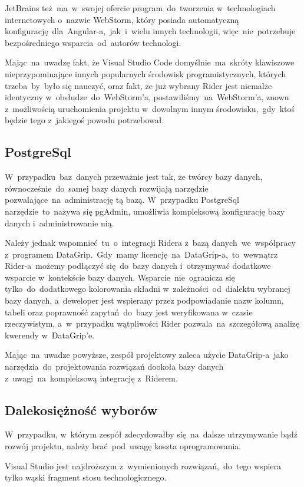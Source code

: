 JetBrains też~ma~w~swojej ofercie program~do~tworzenia w~technologiach internetowych o~nazwie WebStorm, który posiada automatyczną konfigurację~dla~Angular-a,~jak~i~wielu innych technologii, więc~nie~potrzebuje bezpośredniego wsparcia~od~autorów technologi.

Mając~na~uwadzę fakt, że Visual Studio Code domyślnie~ma~skróty klawiszowe nieprzypominające innych popularnych środowisk programistycznych, których trzeba~by~było się nauczyć, oraz fakt, że już wybrany Rider jest niemalże identyczny w~obsłudze~do~WebStorm'a, postawiliśmy~na~WebStorm'a, znowu z~możliwością uruchomienia projektu w~dowolnym innym środowisku,~gdy~ktoś będzie tego z~jakiegoś powodu potrzebował.

\subsection{PostgreSql}\label{subsec:postgresql}
W~przypadku~baz~danych przeważnie jest tak, że twórcy bazy danych, równocześnie~do~samej bazy danych rozwijają narzędzie pozwalające~na~administrację tą bazą.
W~przypadku PostgreSql narzędzie~to~nazywa się pgAdmin, umożliwia kompleksową konfigurację bazy danych i~administrowanie nią.

Należy jednak wspomnieć~tu~o~integracji Ridera z~bazą danych~we~współpracy z~programem DataGrip.~Gdy~mamy licencję~na~DataGrip-a,~to~wewnątrz Rider-a~możemy podłączyć się~do~bazy danych i~otrzymywać dodatkowe wsparcie w~kontekście bazy danych.
Wsparcie~nie~ogranicza się tylko~do~dodatkowego kolorowania składni w~zależności~od~dialektu wybranej bazy danych, a~deweloper jest wspierany przez podpowiadanie nazw kolumn, tabeli oraz poprawność zapytań~do~bazy jest  weryfikowana w~czasie rzeczywistym, a~w~przypadku wątpliwości Rider pozwala~na~szczegółową analizę kwerendy w~DataGrip'e.

Mając~na~uwadze powyższe, zespół projektowy zaleca użycie DataGrip-a~jako narzędzia~do~projektowania rozwiązań dookoła bazy danych z~uwagi~na~kompleksową integrację z~Riderem.

\subsection{Dalekosiężność wyborów}\label{subsec:dalekosieznosc-wyborow}
W~przypadku, w~którym zespół zdecydowałby się~na~dalsze utrzymywanie bądź rozwój projektu, należy brać~pod~uwagę koszta oprogramowania.

Visual Studio jest najdroższym z~wymienionych rozwiązań,~do~tego wspiera tylko wąski fragment stosu technologicznego.

